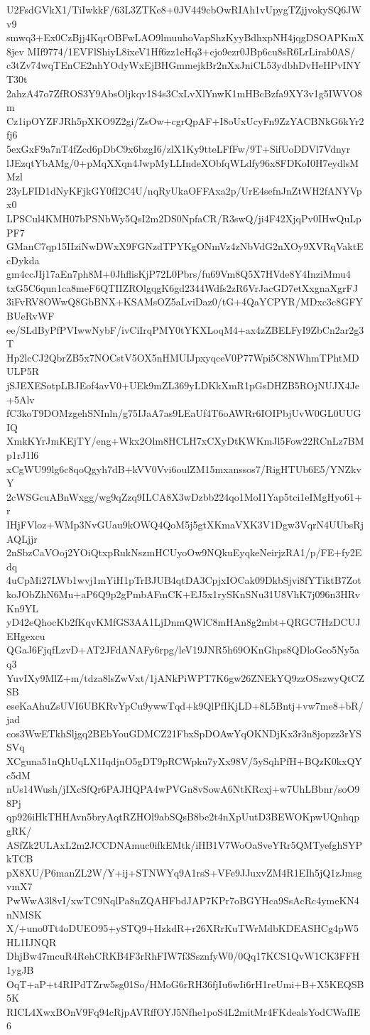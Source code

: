 U2FsdGVkX1/TiIwkkF/63L3ZTKe8+0JV449cbOwRIAh1vUpygTZjjvokySQ6JWv9
smwq3+Ex0CzBjj4KqrOBFwLAO9lmuuhoVapShzKyyBdhxpNH4jqgDSOAPKmX8jev
MIf9774/1EVFlShiyL8ixeV1Hf6zz1eHq3+cjo9ezr0JBp6cu8sR6LrLirab0AS/
c3tZv74wqTEnCE2nhYOdyWxEjBHGmmejkBr2nXxJniCL53ydbhDvHeHPvINYT30t
2ahzA47o7ZfROS3Y9AbsOljkqv1S4s3CxLvXlYnwK1mHBcBzfa9XY3v1g5IWVO8m
Cz1ipOYZFJRh5pXKO9Z2gi/ZsOw+cgrQpAF+I8oUxUcyFn9ZzYACBNkG6kYr2fj6
5exGxF9a7nT4fZcd6pDbC9x6bzgI6/zlX1Ky9tteLFfFw/9T+SifUoDDVl7Vdnyr
lJEzqtYbAMg/0+pMqXXqn4JwpMyLLIndeXObfqWLdfy96x8FDKoI0H7eydlsMMzl
23yLFID1dNyKFjkGY0fI2C4U/nqRyUkaOFFAxa2p/UrE4sefnJnZtWH2fANYVpx0
LPSCul4KMH07bPSNbWy5QsI2m2DS0NpfaCR/R3swQ/ji4F42XjqPv0IHwQuLpPF7
GManC7qp15IIziNwDWxX9FGNzdTPYKgONmVz4zNbVdG2nXOy9XVRqVaktEcDykda
gm4ccJIj17aEn7ph8M+0JhflisKjP72L0Pbrs/fu69Vm8Q5X7HVde8Y4InziMmu4
txG5C6qun1ca8meF6QTIIZROlgqgK6gd2344Wdfs2zR6VrJacGD7etXxgnaXgrFJ
3iFvRV8OWwQ8GbBNX+KSAMsOZ5aLviDaz0/tG+4QaYCPYR/MDxc3c8GFYBUeRvWF
ee/SLdByPfPVIwwNybF/ivCiIrqPMY0tYKXLoqM4+ax4zZBELFyI9ZbCn2ar2g3T
Hp2lcCJ2QbrZB5x7NOCstV5OX5nHMUIJpxyqceV0P77Wpi5C8NWhmTPhtMDULP5R
jSJEXESotpLBJEof4avV0+UEk9mZL369yLDKkXmR1pGsDHZB5ROjNUJX4Je+5Alv
fC3koT9DOMzgehSNInln/g75IJaA7as9LEaUf4T6oAWRr6IOIPbjUvW0GL0UUGIQ
XmkKYrJmKEjTY/eng+Wkx2Olm8HCLH7xCXyDtKWKmJl5Fow22RCnLz7BMp1rJ1l6
xCgWU99lg6c8qoQgyh7dB+kVV0Vvi6oulZM15mxanssos7/RigHTUb6E5/YNZkvY
2cWSGcuABnWxgg/wg9qZzq9ILCA8X3wDzbb224qo1MoI1Yap5tci1eIMgHyo61+r
IHjFVloz+WMp3NvGUau9kOWQ4QoM5j5gtXKmaVXK3V1Dgw3VqrN4UUbsRjAQLjjr
2nSbzCaVOoj2YOiQtxpRukNszmHCUyoOw9NQkuEyqkeNeirjzRA1/p/FE+fy2Edq
4uCpMi27LWb1wvj1mYiH1pTrBJUB4qtDA3CpjxIOCak09DkbSjvi8fYTiktB7Zot
koJObZhN6Mu+aP6Q9p2gPmbAFmCK+EJ5x1rySKnSNu31U8VhK7j096n3HRvKn9YL
yD42eQhocKb2fKqvKMfGS3AA1LjDnmQWlC8mHAn8g2mbt+QRGC7HzDCUJEHgexcu
QGaJ6FjqfLzvD+AT2JFdANAFy6rpg/leV19JNR5h69OKnGhps8QDloGeo5Ny5aq3
YuvIXy9MlZ+m/tdza8lsZwVxt/1jANkPiWPT7K6gw26ZNEkYQ9zzOSszwyQtCZSB
eseKaAhuZsUVI6UBKRvYpCu9ywwTqd+k9QlPfIKjLD+8L5Bntj+vw7me8+bR/jad
cos3WwETkhSljgq2BEbYouGDMCZ21FbxSpDOAwYqOKNDjKx3r3n8jopzz3rYSSVq
XCguna51nQhUqLX1IqdjnO5gDT9pRCWpku7yXx98V/5ySqhPfH+BQzK0kxQYc5dM
nUs14Wush/jIXcSfQr6PAJHQPA4wPVGn8vSowA6NtKRcxj+w7UhLBbnr/soO98Pj
qp926iHkTHHAvn5bryAqtRZHOl9abSQsB8be2t4nXpUutD3BEWOKpwUQnhqpgRK/
ASfZk2ULAxL2m2JCCDNAmuc0ifkEMtk/iHB1V7WoOaSveYRr5QMTyefghSYPkTCB
pX8XU/P6manZL2W/Y+ij+STNWYq9A1rsS+VFe9JJuxvZM4R1EIh5jQ1zJmsgvmX7
PwWwA3l8vI/xwTC9NqlPa8nZQAHFbdJAP7KPr7oBGYHca9SsAcRc4ymeKN4nNMSK
X/+uno0Tt4oDUEO95+ySTQ9+HzkdR+r26XRrKuTWrMdbKDEASHCg4pW5HL1IJNQR
DhjBw47mcuR4RehCRKB4F3rRhFIW7f3SsznfyW0/0Qq17KCS1QvW1CK3FFH1ygJB
OqT+aP+t4RIPdTZrw5sg01So/HMoG6rRH36fjIu6wIi6rH1reUmi+B+X5KEQSB5K
RICL4XwxBOnV9Fq94cRjpAVRffOYJ5Nfhe1poS4L2mitMr4FKdealsYodCWafIE6
